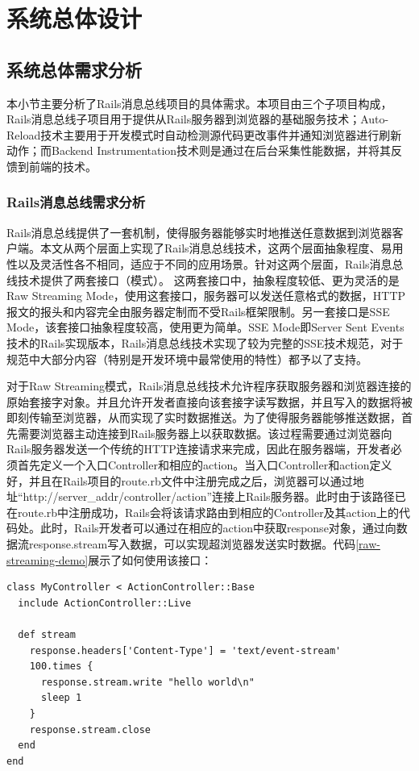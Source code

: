 \chapter{系统总体设计}
\section{系统总体需求分析}
本小节主要分析了Rails消息总线项目的具体需求。本项目由三个子项目构成，Rails消息总线子项目用于提供从Rails服务器到浏览器的基础服务技术；Auto-Reload技术主要用于开发模式时自动检测源代码更改事件并通知浏览器进行刷新动作；而Backend Instrumentation技术则是通过在后台采集性能数据，并将其反馈到前端的技术。

\subsection{Rails消息总线需求分析}
Rails消息总线提供了一套机制，使得服务器能够实时地推送任意数据到浏览器客户端。本文从两个层面上实现了Rails消息总线技术，这两个层面抽象程度、易用性以及灵活性各不相同，适应于不同的应用场景。针对这两个层面，Rails消息总线技术提供了两套接口（模式）。 这两套接口中，抽象程度较低、更为灵活的是Raw Streaming Mode，使用这套接口，服务器可以发送任意格式的数据，HTTP报文的报头和内容完全由服务器定制而不受Rails框架限制。另一套接口是SSE Mode，该套接口抽象程度较高，使用更为简单。SSE Mode即Server Sent Events技术的Rails实现版本，Rails消息总线技术实现了较为完整的SSE技术规范，对于规范中大部分内容（特别是开发环境中最常使用的特性）都予以了支持。

对于Raw Streaming模式，Rails消息总线技术允许程序获取服务器和浏览器连接的原始套接字对象。并且允许开发者直接向该套接字读写数据，并且写入的数据将被即刻传输至浏览器，从而实现了实时数据推送。为了使得服务器能够推送数据，首先需要浏览器主动连接到Rails服务器上以获取数据。该过程需要通过浏览器向Rails服务器发送一个传统的HTTP连接请求来完成，因此在服务器端，开发者必须首先定义一个入口Controller和相应的action。当入口Controller和action定义好，并且在Rails项目的route.rb文件中注册完成之后，浏览器可以通过地址“http://server\_addr/controller/action”连接上Rails服务器。此时由于该路径已在route.rb中注册成功，Rails会将该请求路由到相应的Controller及其action上的代码处。此时，Rails开发者可以通过在相应的action中获取response对象，通过向数据流response.stream写入数据，可以实现超浏览器发送实时数据。代码\ref{raw-streaming-demo}展示了如何使用该接口：

\begin{lstlisting}[caption={Raw Streaming Mode使用示例}, label=raw-streaming-demo]
class MyController < ActionController::Base
  include ActionController::Live

  def stream
    response.headers['Content-Type'] = 'text/event-stream'
    100.times {
      response.stream.write "hello world\n"
      sleep 1
    }
    response.stream.close
  end
end
\end{lstlisting}

